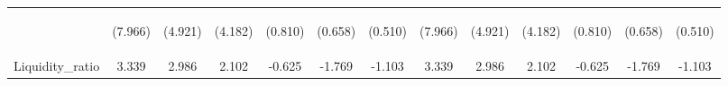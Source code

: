 \documentclass[]{article}
\begin{document}
\begin{center}
\begin{tabular}{lcccccccccccc}
\vspace{4pt} & \begin{footnotesize}(7.966)\end{footnotesize} & \begin{footnotesize}(4.921)\end{footnotesize} & \begin{footnotesize}(4.182)\end{footnotesize} & \begin{footnotesize}(0.810)\end{footnotesize} & \begin{footnotesize}(0.658)\end{footnotesize} & \begin{footnotesize}(0.510)\end{footnotesize} & \begin{footnotesize}(7.966)\end{footnotesize} & \begin{footnotesize}(4.921)\end{footnotesize} & \begin{footnotesize}(4.182)\end{footnotesize} & \begin{footnotesize}(0.810)\end{footnotesize} & \begin{footnotesize}(0.658)\end{footnotesize} & \begin{footnotesize}(0.510)\end{footnotesize} \\
Liquidity\_ratio & 3.339 & 2.986 & 2.102 & -0.625 & -1.769 & -1.103 & 3.339 & 2.986 & 2.102 & -0.625 & -1.769 & -1.103 \\

\end{tabular}
\end{center}
\end{document}

